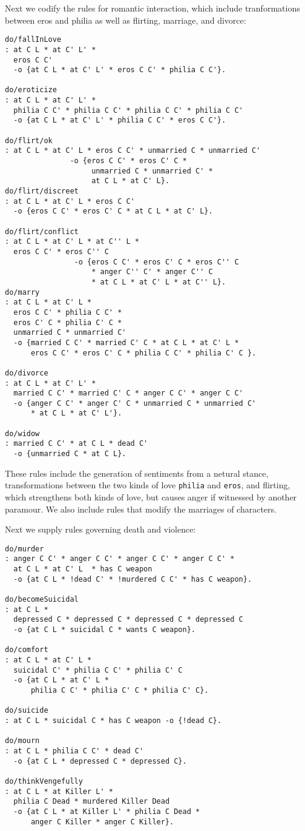 \documentclass[letterpaper]{article}
\begin{document}
Next we codify the rules for romantic interaction, which include
tranformations between eros and philia as well as flirting, marriage, and
divorce:
\begin{verbatim}
do/fallInLove
: at C L * at C' L' *
  eros C C'
  -o {at C L * at C' L' * eros C C' * philia C C'}.

do/eroticize
: at C L * at C' L' *
  philia C C' * philia C C' * philia C C' * philia C C'
  -o {at C L * at C' L' * philia C C' * eros C C'}.

do/flirt/ok
: at C L * at C' L * eros C C' * unmarried C * unmarried C'
               -o {eros C C' * eros C' C * 
                    unmarried C * unmarried C' *
                    at C L * at C' L}.
do/flirt/discreet
: at C L * at C' L * eros C C'
  -o {eros C C' * eros C' C * at C L * at C' L}.

do/flirt/conflict 
: at C L * at C' L * at C'' L *
  eros C C' * eros C'' C
                -o {eros C C' * eros C' C * eros C'' C 
                    * anger C'' C' * anger C'' C
                    * at C L * at C' L * at C'' L}.
do/marry 
: at C L * at C' L * 
  eros C C' * philia C C' * 
  eros C' C * philia C' C * 
  unmarried C * unmarried C'
  -o {married C C' * married C' C * at C L * at C' L *
      eros C C' * eros C' C * philia C C' * philia C' C }.

do/divorce
: at C L * at C' L' *
  married C C' * married C' C * anger C C' * anger C C'
  -o {anger C C' * anger C' C * unmarried C * unmarried C'
      * at C L * at C' L'}.

do/widow
: married C C' * at C L * dead C'
  -o {unmarried C * at C L}.
\end{verbatim}

These rules include the generation of sentiments from a netural stance,
transformations between the two kinds of love \verb|philia| and \verb|eros|,
and flirting, which strengthens both kinds of love, but causes anger if
witnessed by another paramour. We also include rules that modify the
marriages of characters.

Next we supply rules governing death and violence:
\begin{verbatim}
do/murder 
: anger C C' * anger C C' * anger C C' * anger C C' *
  at C L * at C' L  * has C weapon
  -o {at C L * !dead C' * !murdered C C' * has C weapon}.

do/becomeSuicidal
: at C L *
  depressed C * depressed C * depressed C * depressed C
  -o {at C L * suicidal C * wants C weapon}.

do/comfort
: at C L * at C' L *
  suicidal C' * philia C C' * philia C' C
  -o {at C L * at C' L * 
      philia C C' * philia C' C * philia C' C}.

do/suicide
: at C L * suicidal C * has C weapon -o {!dead C}. 

do/mourn 
: at C L * philia C C' * dead C' 
  -o {at C L * depressed C * depressed C}.

do/thinkVengefully
: at C L * at Killer L' * 
  philia C Dead * murdered Killer Dead
  -o {at C L * at Killer L' * philia C Dead *
      anger C Killer * anger C Killer}.
\end{verbatim}
\end{document}
